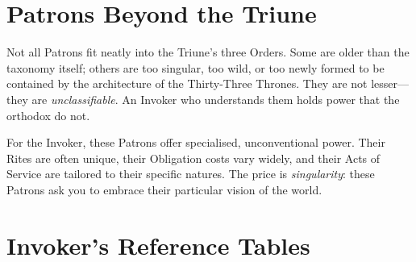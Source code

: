 
\section{Patrons Beyond the Triune}
\label{sec:patrons-beyond}

Not all Patrons fit neatly into the Triune's three Orders. Some are older than the taxonomy itself; others are too singular, too wild, or too newly formed to be contained by the architecture of the Thirty-Three Thrones. They are not lesser---they are \emph{unclassifiable}. An Invoker who understands them holds power that the orthodox do not.

For the Invoker, these Patrons offer specialised, unconventional power. Their Rites are often unique, their Obligation costs vary widely, and their Acts of Service are tailored to their specific natures. The price is \emph{singularity}: these Patrons ask you to embrace their particular vision of the world.

\newpage

\newpage
\newpage
\newpage
\newpage
\newpage
\newpage
\newpage
\newpage
\newpage


\clearpage
\section{Invoker's Reference Tables}
\label{sec:invoker-tables}


